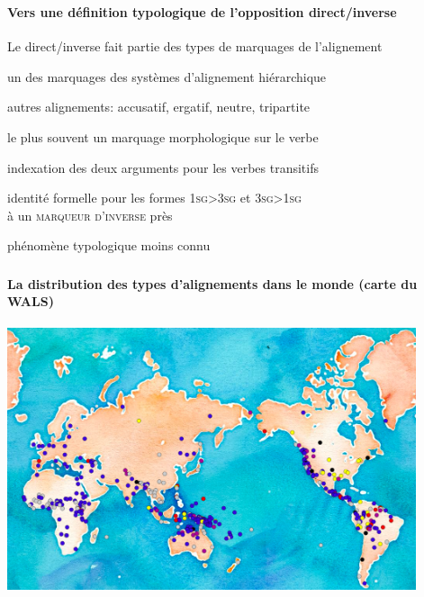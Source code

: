 \begin{frame}
\frametitle{}
\framesubtitle{Vers une définition typologique de l'opposition direct/inverse}
\begin{wideitemize}
\item Le direct/inverse fait partie des types de marquages de
  l'alignement
\begin{smallwideitemize}
\item un des marquages des systèmes d'alignement hiérarchique
\item autres alignements: accusatif, ergatif, neutre, tripartite
\pause
\item le plus souvent un marquage morphologique sur le verbe
\item indexation des deux arguments pour les verbes transitifs
\item identité formelle pour les formes \textsc{1sg>3sg} et
  \textsc{3sg>1sg}\\ à un \textsc{marqueur d'inverse} près
\pause
\item phénomène typologique moins connu
\item \cite{zuniga06}
\end{smallwideitemize}
\end{wideitemize}
\end{frame}


\begin{frame}
\frametitle{}
\framesubtitle{La distribution des types d'alignements 
  dans le monde (carte du WALS)}
\begin{center}
\vspace*{-.3cm}
\includegraphics[width=120mm]{hierarchy}

\end{center}
\end{frame}


